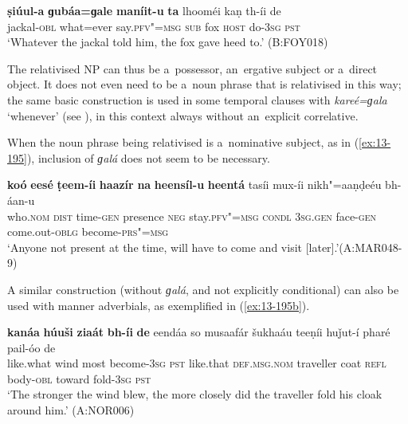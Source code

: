 \ex
\label{ex:13-194}
\gll \textbf{ṣiúul-a} \textbf{ɡubáa=ɡale} \textbf{maníit-u} \textbf{ta} lhooméi kaṇ  th-íi de \\
jackal-\textsc{obl} what=ever say.\textsc{pfv"=msg} \textsc{sub} fox \textsc{host} do-\textsc{3sg} \textsc{pst} \\
\glt `Whatever the jackal told him, the fox gave heed to.' (B:FOY018) 
\z



The relativised NP can thus be a~possessor, an~ergative subject or a~direct object. It does not even need to be a~noun phrase that is relativised in this way; the same basic construction is used in some temporal clauses with \textit{kareé=ɡala} `whenever' (see ), in this context always without an~explicit correlative.


When the noun phrase being relativised is a~nominative subject, as in (\ref{ex:13-195}), inclusion of \textit{ɡalá} does not seem to be necessary. 

\begin{exe}
\ex
\label{ex:13-195}
\gll \textbf{koó} \textbf{eesé} \textbf{ṭeem-íi} \textbf{haazír} \textbf{na} \textbf{heensíl-u} \textbf{ heentá} tasíi mux-íi nikh"=aaṇḍeéu bh-áan-u \\
who.\textsc{nom} \textsc{dist} time-\textsc{gen} presence \textsc{neg} stay.\textsc{pfv"=msg}  \textsc{condl } \textsc{3sg.gen} face-\textsc{gen} come.out-\textsc{oblg} become-\textsc{prs"=msg} \\
\glt `Anyone not present at the time, will have to come and visit [later].'\newline (A:MAR048-9)
\end{exe}

A similar construction (without \textit{ɡalá}, and not explicitly conditional) can also be used with manner adverbials, as exemplified in (\ref{ex:13-195b}).

\begin{exe}
\ex
\label{ex:13-195b}
\gll \textbf{kanáa} \textbf{húuši} \textbf{ziaát} \textbf{bh-íi} \textbf{de} eendáa so musaafár šukhaáu teeṇíi huǰut-í pharé pail-óo de\\
like.what wind most become-\textsc{3sg} \textsc{pst} like.that \textsc{def.msg.nom} traveller coat \textsc{refl} body-\textsc{obl} toward fold-\textsc{3sg} \textsc{pst} \\
\glt `The stronger the wind blew, the more closely did the traveller fold his cloak around him.' (A:NOR006)
\end{exe}


